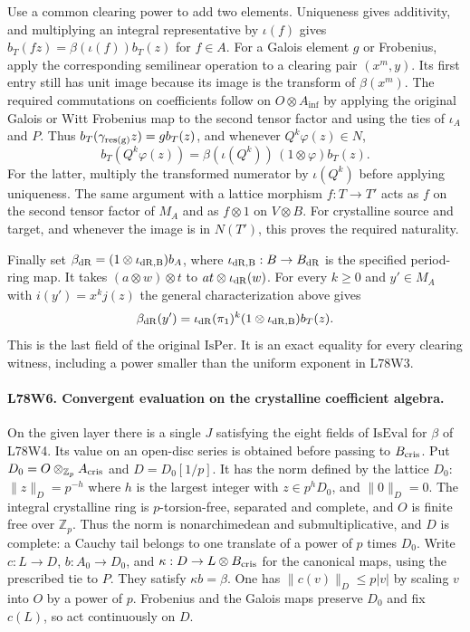 Use a common clearing power to add two elements. Uniqueness gives
additivity, and multiplying an integral representative by
$\iota(f)$ gives $b_T(fz)=\beta(\iota(f))b_T(z)$ for $f\in A$.
For a Galois element $g$ or Frobenius, apply the corresponding
semilinear operation to a clearing pair $(x^m,y)$. Its first entry
still has unit image because its image is the transform of
$\beta(x^m)$. The required commutations on coefficients follow on
$O\otimes A_{\inf}$ by applying the original Galois or Witt
Frobenius map to the second tensor factor and using the ties of
$\iota_A$ and $P$. Thus $b_T(\gamma_{\rm res(g)}z)=g b_T(z)$,
and whenever $Q^k\varphi(z)\in N$,
\[
 b_T(Q^k\varphi(z))=\beta(\iota(Q^k))\,(1\otimes\varphi)b_T(z).
\]
For the latter, multiply the transformed numerator by $\iota(Q^k)$
before applying uniqueness. The same argument with a lattice
morphism $f:T\to T'$ acts as $f$ on the second tensor factor of
$M_A$ and as $f\otimes 1$ on $V\otimes B$. For crystalline source
and target, and whenever the image is in $N(T')$, this proves the
required naturality.

Finally set $\beta_{\rm dR}=(1\otimes\iota_{\rm dR,B})b_A$, where
$\iota_{\rm dR,B}:B\to B_{\rm dR}$ is the specified period-ring map.
It takes $(a\otimes w)\otimes t$ to $at\otimes\iota_{\rm dR}(w)$.
For every $k\ge0$ and $y'\in M_A$ with $i(y')=x^k j(z)$ the general
characterization above gives
\[
 \beta_{\rm dR}(y')=\iota_{\rm dR}(\pi_1)^k
                 (1\otimes\iota_{\rm dR,B})b_T(z).
\]
This is the last field of the original $\mathrm{IsPer}$.
It is an exact equality for every clearing witness, including a
power smaller than the uniform exponent in L78W3.

\paragraph{L78W6. Convergent evaluation on the crystalline coefficient algebra.}
On the given layer there is a single $J$ satisfying the eight fields of
$\mathrm{IsEval}$ for $\beta$ of L78W4. Its value on an open-disc
series is obtained before passing to $B_{\rm cris}$. Put
$D_0=O\otimes_{\mathbb Z_p}A_{\rm cris}$ and $D=D_0[1/p]$.
It has the norm defined by the lattice $D_0$:
$\|z\|_D=p^{-h}$ where $h$ is the largest integer with
$z\in p^hD_0$, and $\|0\|_D=0$. The integral crystalline ring is
$p$-torsion-free, separated and complete, and $O$ is finite free
over $\mathbb Z_p$. Thus the norm is nonarchimedean and
submultiplicative, and $D$ is complete: a Cauchy tail belongs to
one translate of a power of $p$ times $D_0$. Write
$c:L\to D$, $b:A_0\to D_0$, and
$\kappa:D\to L\otimes B_{\rm cris}$ for the canonical maps, using
the prescribed tie to $P$. They satisfy $\kappa b=\beta$.
One has $\|c(v)\|_D\le p|v|$ by scaling $v$ into $O$ by a power
of $p$. Frobenius and the Galois maps preserve $D_0$ and fix $c(L)$,
so act continuously on $D$.

